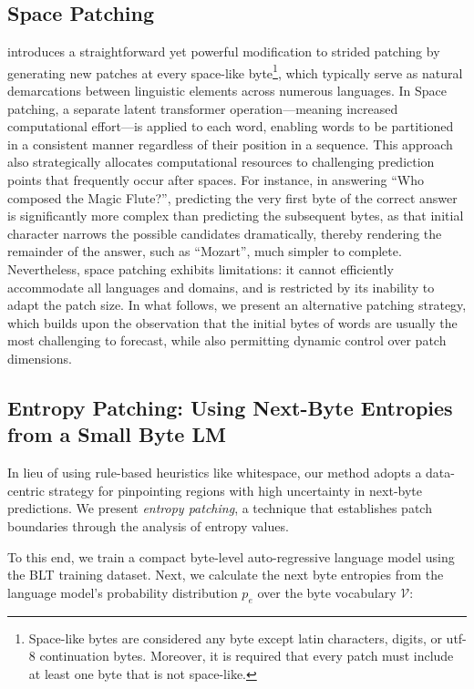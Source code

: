 \subsection{Space Patching}
\label{section:white-patch}

\citet{slagle2024spacebyte} introduces a straightforward yet powerful modification to strided patching by generating new patches at every space-like byte\footnote{
    Space-like bytes are considered any byte except latin characters, digits, or utf-8 continuation bytes. Moreover, it is required that every patch must include at least one byte that is not space-like.}, which typically serve as natural demarcations between linguistic elements across numerous languages. In Space patching, a separate latent transformer operation—meaning increased computational effort—is applied to each word, enabling words to be partitioned in a consistent manner regardless of their position in a sequence. This approach also strategically allocates computational resources to challenging prediction points that frequently occur after spaces. For instance, in answering ``Who composed the Magic Flute?\uline{\hspace{.6em}}'', predicting the very first byte of the correct answer is significantly more complex than predicting the subsequent bytes, as that initial character narrows the possible candidates dramatically, thereby rendering the remainder of the answer, such as ``Mozart'', much simpler to complete. Nevertheless, space patching exhibits limitations: it cannot efficiently accommodate all languages and domains, and is restricted by its inability to adapt the patch size. In what follows, we present an alternative patching strategy, which builds upon the observation that the initial bytes of words are usually the most challenging to forecast, while also permitting dynamic control over patch dimensions.

\subsection{Entropy Patching: Using Next-Byte Entropies from a Small Byte LM}
\label{section:dyn-patch}

In lieu of using rule-based heuristics like whitespace, our method adopts a data-centric strategy for pinpointing regions with high uncertainty in next-byte predictions. We present \textit{entropy patching}, a technique that establishes patch boundaries through the analysis of entropy values.

To this end, we train a compact byte-level auto-regressive language model using the {\textsc BLT} training dataset. Next, we calculate the next byte entropies from the language model's probability distribution $p_{e}$ over the byte vocabulary $\mathcal{V}$:

